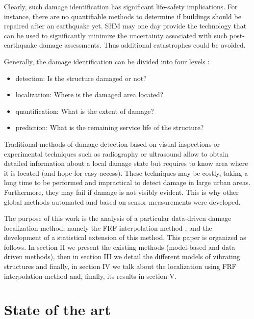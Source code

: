 \documentclass[journal]{IEEEtran}
\begin{document}
Clearly, such damage identification has significant life-safety implications.
For instance, there are  no quantifiable methods to
 determine if buildings should be repaired after an earthquake yet.
SHM may one day provide the technology that can be used to significantly minimize
 the uncertainty associated with such post-earthquake damage assessments.
Thus additional catastrophes could be avoided.


Generally, the damage identification can be divided into four levels \cite{peeters2000system}:
\begin{itemize}
\item detection: Is the structure damaged or not?
\item localization: Where is the damaged area located?
\item quantification: What is the extent of damage?
\item prediction: What is the remaining service life of the structure?
\end{itemize}
\vspace{2mm}

Traditional methods of damage detection based on visual inspections or experimental techniques such as radiography
 or ultrasound allow to obtain detailed information about a local damage state but requires to know area where it is located (and hope for easy access). 
These techniques may be costly, taking a long time to be performed and impractical to detect damage in large urban areas.
 Furthermore, they may fail if damage is not visibly evident. This is why other global methods automated
 and based on sensor measurements were developed.



The purpose of this work is the analysis of a particular data-driven damage localization method,
 namely the FRF interpolation method \cite{dilena2015damage}, and the development of a statistical extension of this method.
This paper is organized as follows. In section II we  present the existing methods (model-based and data driven methods), 
then in section III we detail the different models of vibrating structures and finally, in section IV we talk about the localization using FRF interpolation method and, finally,  its results in section V.



\section{State of the art}
\end{document}
